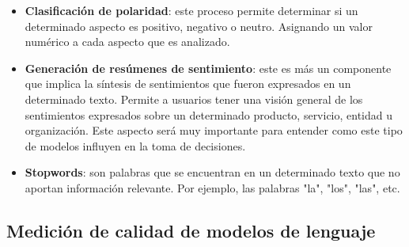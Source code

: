 \documentclass[12pt, conference]{IEEEtran}
\begin{document}
\begin{itemize}
  \item \textbf{Clasificación de polaridad}: este proceso permite determinar si un determinado aspecto es positivo, negativo o neutro. Asignando un valor numérico a cada aspecto que es analizado.
  \item \textbf{Generación de resúmenes de sentimiento}: este es más un componente que implica la síntesis de sentimientos que fueron expresados en un determinado texto. Permite a usuarios tener una visión general de los sentimientos expresados sobre un determinado producto, servicio, entidad u organización. Este aspecto será muy importante para entender como este tipo de modelos influyen en la toma de decisiones.
  \item \textbf{Stopwords}: son palabras que se encuentran en un determinado texto que no aportan información relevante. Por ejemplo, las palabras "la", "los", "las", etc.
\end{itemize}

\subsection{Medición de calidad de modelos de lenguaje}
\end{document}
